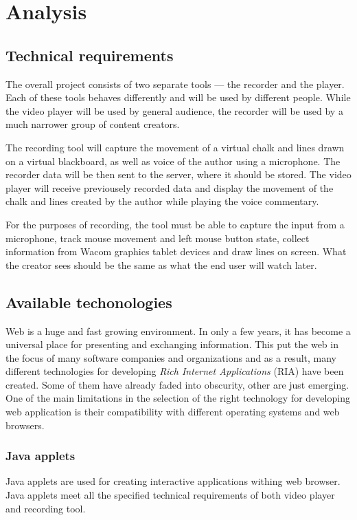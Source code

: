 \chapter{Analysis}

\section{Technical requirements}
The overall project consists of two separate tools --- the recorder and the player. Each of these tools behaves differently and will be used by different people. While the video player will be used by general audience, the recorder will be used by a much narrower group of content creators.

The recording tool will capture the movement of a virtual chalk and lines drawn on a virtual blackboard, as well as voice of the author using a microphone. The recorder data will be then sent to the server, where it should be stored. The video player will receive previousely recorded data and display the movement of the chalk and lines created by the author while playing the voice commentary.

For the purposes of recording, the tool must be able to capture the input from a microphone, track mouse movement and left mouse button state, collect information from Wacom graphics tablet devices and draw lines on screen. What the creator sees should be the same as what the end user will watch later.

\section{Available techonologies}
Web is a huge and fast growing environment. In only a few years, it has become a universal place for presenting and exchanging information. This put the web in the focus of many software companies and organizations and as a result, many different technologies for developing \textit{Rich Internet Applications} (RIA) have been created. Some of them have already faded into obscurity, other are just emerging. One of the main limitations in the selection of the right technology for developing web application is their compatibility with different operating systems and web browsers.

\subsection{Java applets}
Java applets are used for creating interactive applications withing web browser. Java applets meet all the specified technical requirements of both video player and recording tool.

